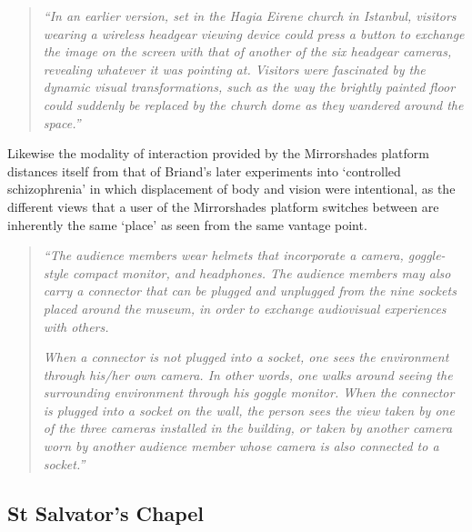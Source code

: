 \begin{quote}
	\textit{``In an earlier version, set in the Hagia Eirene church in Istanbul, visitors wearing a wireless headgear viewing device could press a button to exchange the image on the screen with that of another of the six headgear cameras, revealing whatever it was pointing at. Visitors were fascinated by the dynamic visual transformations, such as the way the brightly painted floor could suddenly be replaced by the church dome as they wandered around the space.''}~\cite{Jones2006}
\end{quote}

Likewise the modality of interaction provided by the Mirrorshades platform distances itself from that of Briand's later experiments into `controlled schizophrenia' in which displacement of body and vision were intentional, as the different views that a user of the Mirrorshades platform switches between are inherently the same `place' as seen from the same vantage point.

\begin{quote}
	\textit{``The audience members wear helmets that incorporate a camera, goggle-style compact monitor, and headphones. The audience members may also carry a connector that can be plugged and unplugged from the nine sockets placed around the museum, in order to exchange audiovisual experiences with others.}

	\textit{When a connector is not plugged into a socket, one sees the environment through his/her own camera. In other words, one walks around seeing the surrounding environment through his goggle monitor. When the connector is plugged into a socket on the wall, the person sees the view taken by one of the three cameras installed in the building, or taken by another camera worn by another audience member whose camera is also connected to a socket.''}~\cite{Jones2006}
\end{quote}


\subsection{St Salvator's Chapel}

